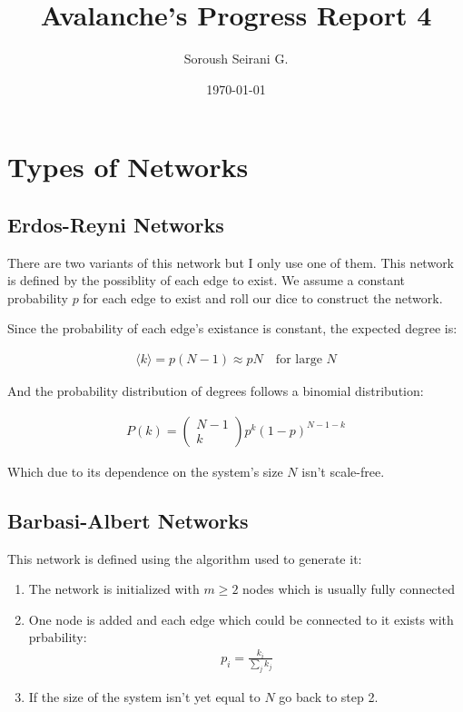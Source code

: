 \documentclass{article}
\author{Soroush Seirani G.}
\date{\today}
\title{Avalanche's Progress Report 4}
\newcommand{\avg}[1]{\langle #1 \rangle}
\begin{document}
\maketitle
\section{Types of Networks}
\label{sec:orgb1c7005}
\subsection{Erdos-Reyni Networks}
\label{sec:org609a910}
There are two variants of this network but I only use one of
them. This network is defined by the possiblity of each edge to
exist. We assume a constant probability \(p\) for each edge to exist and
roll our dice to construct the network.

Since the probability of each edge's existance is constant, the
expected degree is:

\begin{gather}
  \avg{k} = p(N-1) \approx pN \quad \text{for large $N$}
\end{gather}

And the probability distribution of degrees follows a binomial
distribution:

\begin{gather}
  P(k) = \begin{pmatrix}
    N-1\\
    k
  \end{pmatrix} p^k (1-p)^{N-1-k}
\end{gather}

Which due to its dependence on the system's size \(N\) isn't scale-free.
\subsection{Barbasi-Albert Networks}
\label{sec:org231968b}
This network is defined using the algorithm used to generate it:

\begin{enumerate}
\item The network is initialized with \(m \ge 2\) nodes which is usually
fully connected
\item One node is added and each edge which could be
connected to it exists with prbability:
\begin{gather}
  p_i = \frac{k_i}{\sum_j k_j}
\end{gather}
\item If the size of the system isn't yet equal to \(N\) go back to step 2.
\end{enumerate}
\end{document}

